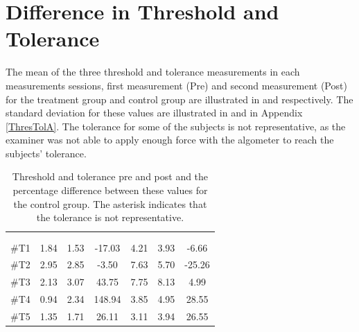 \section{Difference in Threshold and Tolerance}
The mean of the three threshold and tolerance measurements in each measurements sessions, first measurement (Pre) and second measurement (Post) for the treatment group and control group are illustrated in   and  respectively. The standard deviation for these values are illustrated in  and  in Appendix \autoref{ThresTolA}. The tolerance for some of the subjects is not representative, as the examiner was not able to apply enough force with the algometer to reach the subjects' tolerance.

\begin{longtable} {l|c|c|c|c|c|c}
	\caption{Threshold and tolerance pre and post and the percentage difference between these values for the control group. The asterisk indicates that the tolerance is not representative.}
	\label{tab:Treatment} \\
\cellcolor[HTML]{C0C0C0} {} & 
\multicolumn{3}{c|}{ \cellcolor[HTML]{C0C0C0}{\textbf{Threshold}}} & \multicolumn{3}{c}{ \cellcolor[HTML]{C0C0C0}{\textbf{Tolerance}}}  	\\  \rule{0pt}{3ex} 
  \cellcolor[HTML]{C0C0C0}{} &
 \multicolumn{1}{c|}{ \cellcolor[HTML]{C0C0C0}{Pre [KgF]}} & \multicolumn{1}{c|}{ \cellcolor[HTML]{C0C0C0}{Post [KgF]}} 
 & \multicolumn{1}{c}{ \cellcolor[HTML]{C0C0C0}{\textcolor[HTML]{C0C0C0}{0}Diff [\%]\textcolor[HTML]{C0C0C0}{0}}}
 & \multicolumn{1}{|c|}{ \cellcolor[HTML]{C0C0C0}{Pre [KgF]}} 
 & \multicolumn{1}{c|}{ \cellcolor[HTML]{C0C0C0}{Post [KgF]}} 
 & \multicolumn{1}{c}{ \cellcolor[HTML]{C0C0C0}{\textcolor[HTML]{C0C0C0}{0}Diff [\%]\textcolor[HTML]{C0C0C0}{0}}}  	\\ \hline 
\#T1 & 1.84 & 1.53 & -17.03 & 4.21 & 3.93 & -6.66 \\ \hline
\#T2 & 2.95 & 2.85  & -3.50 & 7.63  & 5.70 & -25.26 \\ \hline
\#T3 & 2.13 & 3.07 & 43.75 & 7.75 & 8.13 & 4.99 \\ \hline
\#T4 & 0.94 & 2.34  & 148.94  & 3.85 & 4.95 & 28.55 \\ \hline
\#T5 & 1.35 & 1.71  & 26.11 & 3.11 & 3.94 & 26.55 \\ \hline	

\end{longtable}
